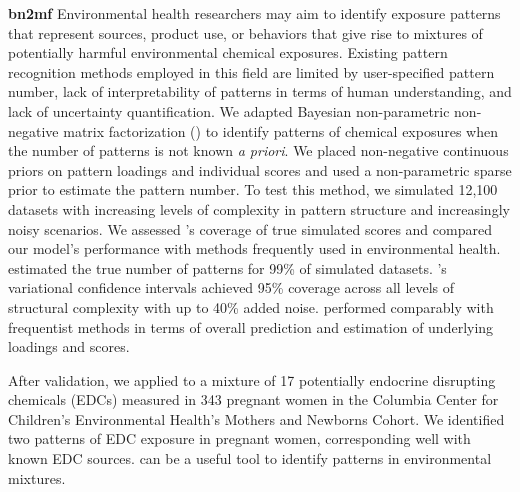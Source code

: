 \textbf{bn2mf}
Environmental health researchers may aim to identify exposure patterns that represent sources, product use, or behaviors that give rise to mixtures of potentially harmful environmental chemical exposures. Existing pattern recognition methods employed in this field are limited by user-specified pattern number, lack of interpretability of patterns in terms of human understanding, and lack of uncertainty quantification. We adapted Bayesian non-parametric non-negative matrix factorization (\bnmfc) to identify patterns of chemical exposures when the number of patterns is not known \textit{a priori}. We placed non-negative continuous priors on pattern loadings and individual scores and used a non-parametric sparse prior to estimate the pattern number. To test this method, we simulated 12,100 datasets with increasing levels of complexity in pattern structure and increasingly noisy scenarios. We assessed \bnmfc's coverage of true simulated scores and compared our model's performance with methods frequently used in environmental health. \bnmf estimated the true number of patterns for 99\% of simulated datasets. \bnmfc's variational confidence intervals achieved 95\% coverage across all levels of structural complexity with up to 40\% added noise. \bnmf performed comparably with frequentist methods in terms of overall prediction and estimation of underlying loadings and scores.

After validation, we applied \bnmf to a mixture of 17 potentially endocrine disrupting chemicals (EDCs) measured in 343 pregnant women in the Columbia Center for Children’s Environmental Health's Mothers and Newborns Cohort.  We identified two patterns of EDC exposure in pregnant women, corresponding well with known EDC sources. \bnmf can be a useful tool to identify patterns in environmental mixtures.

\thispagestyle{empty} 
\clearpage
